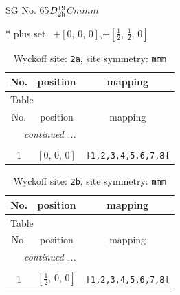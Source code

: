 \documentclass[fleqn,8pt]{jsarticle}
\begin{document}
\setcounter{MaxMatrixCols}{32}

\renewcommand{\tablename}{Table~}
\renewcommand{\figurename}{Figure~}
\begin{center}
\LARGE
SG No. 65\quad$D_{\rm 2h}^{19}$\quad$Cmmm$\quad[ orthorhombic ]
\end{center}
* plus set:\,\,\,$+\left[ 0,\, 0,\, 0 \right]$,\quad $+\left[ \frac{1}{2},\, \frac{1}{2},\, 0 \right]$
\renewcommand{\arraystretch}{1.2}
\begin{longtable}{ccc}
\caption{Wyckoff site: {\tt 2a}, site symmetry: {\tt mmm}}
 \\
 \hline \hline
No. & position & mapping \\ \hline \endfirsthead

\multicolumn{2}{l}{\tablename\ \thetable{}} \\
 \hline \hline
No. & position & mapping \\ \hline \endhead

 \hline \hline
\multicolumn{2}{r}{\footnotesize\it continued ...} \\ \endfoot

 \hline \hline
\multicolumn{2}{r}{} \\ \endlastfoot

1 & $\left[ 0,\, 0,\, 0 \right]$ & {\tt [1,2,3,4,5,6,7,8]} \\
\end{longtable}
\renewcommand{\arraystretch}{1.2}
\begin{longtable}{ccc}
\caption{Wyckoff site: {\tt 2b}, site symmetry: {\tt mmm}}
 \\
 \hline \hline
No. & position & mapping \\ \hline \endfirsthead

\multicolumn{2}{l}{\tablename\ \thetable{}} \\
 \hline \hline
No. & position & mapping \\ \hline \endhead

 \hline \hline
\multicolumn{2}{r}{\footnotesize\it continued ...} \\ \endfoot

 \hline \hline
\multicolumn{2}{r}{} \\ \endlastfoot

1 & $\left[ \frac{1}{2},\, 0,\, 0 \right]$ & {\tt [1,2,3,4,5,6,7,8]} \\
\end{longtable}
\renewcommand{\arraystretch}{1.2}
\end{document}

